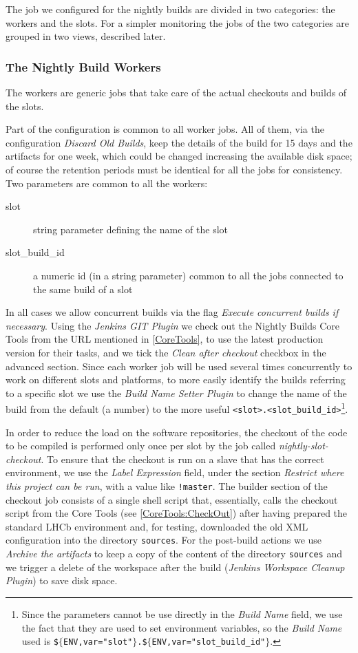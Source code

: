 \documentclass{lhcbnote}
\begin{document}
The job we configured for the nightly builds are divided in two categories: the
workers and the slots.  For a simpler monitoring the jobs of the two categories
are grouped in two views, described later.

\subsubsection{The Nightly Build Workers}
\label{Jenkins:Workers}
The workers are generic jobs that take care of the actual checkouts and builds
of the slots.

Part of the configuration is common to all worker jobs.  All of them, via the
configuration \emph{Discard Old Builds}, keep the details of the build for 15
days and the artifacts for one week, which could be changed increasing the
available disk space; of course the retention periods must be identical for all
the jobs for consistency.  Two parameters are common to all the workers:
\begin{description}
  \item[slot] string parameter defining the name of the slot
  \item[slot\_build\_id] a numeric id (in a string parameter) common to all the
jobs connected to the same build of a slot
\end{description}
In all cases we allow concurrent builds via the flag \emph{Execute concurrent
builds if necessary}.  Using the \emph{Jenkins GIT Plugin} we check out the
Nightly Builds Core Tools from the URL mentioned in \ref{CoreTools}, to use the
latest production version for their tasks, and we tick the \emph{Clean after
checkout} checkbox in the advanced section.  Since each worker job will be used
several times concurrently to work on different slots and platforms, to more
easily identify the builds referring to a specific slot we use the \emph{Build
Name Setter Plugin} to change the name of the build from the default (a number)
to the more useful \verb|<slot>.<slot_build_id>|\footnote{Since the parameters
cannot be use directly in the \emph{Build Name} field, we use the fact that they
are used to set environment variables, so the \emph{Build Name} used is
\texttt{\$$\{$ENV,var="slot"$\}$.\$$\{$ENV,var="slot\_build\_id"$\}$}.}.

In order to reduce the load on the software repositories, the checkout of the
code to be compiled is performed only once per slot by the job called
\emph{nightly-slot-checkout}.  To ensure that the checkout is run on a slave
that has the correct environment, we use the \emph{Label Expression} field,
under the section \emph{Restrict where this project can be run}, with a value
like \verb|!master|.  The builder section of the checkout job consists of a
single shell script that, essentially, calls the checkout script from the Core
Tools (see \ref{CoreTools:CheckOut}) after having prepared the standard LHCb
environment and, for testing, downloaded the old XML configuration into the
directory \texttt{sources}.  For the post-build actions we use \emph{Archive the
artifacts} to keep a copy of the content of the directory \texttt{sources} and
we trigger a delete of the workspace after the build (\emph{Jenkins Workspace
Cleanup Plugin}) to save disk space.
\end{document}
